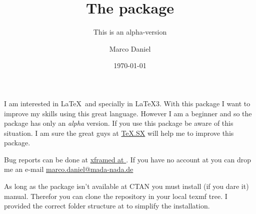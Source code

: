 \documentclass[openany,12pt,tocdepth=3]{ltx-md}
\begin{document}
\title{The  package}
\subtitle{This is an alpha-version}
\author{Marco Daniel}
\date{\today}
\maketitle
\vspace*{\fill}
\begin{xframed}[line-width=3pt,line-color=purple!30!white,bg-color=yellow!10,developer-info,margin=1cm]
\rule{0pt}{5cm}
\end{xframed}
\clearpage
{}
\tableofcontents


\label{sec:intro}
I am interested in \LaTeX\ and specially in \LaTeX3. With this package I want
to improve my skills using this great language. However I am a beginner and
so the package has only an \textit{alpha} version. If you use this package
be aware of this situation. I am sure the great guys at
\faArrowRight\href{http://tex.stackexchange.com/}{TeX.SX} will help me to improve this package.


\label{sec:bug-reports}
Bug reports can be done at
\href{https://github.com/marcodaniel/xframed/issues}{xframed at \Github}. If you have no
account at \Github you can drop me an e-mail
\href{mailto:marco.daniel@mada-nada.de}{\faEnvelope marco.daniel@mada-nada.de}

As long as the package isn't available at CTAN you must install (if you dare it)
manual. Therefor you can clone the repository in your local texmf tree. I provided
the correct folder structure at \Github to simplify the installation.
\end{document}
